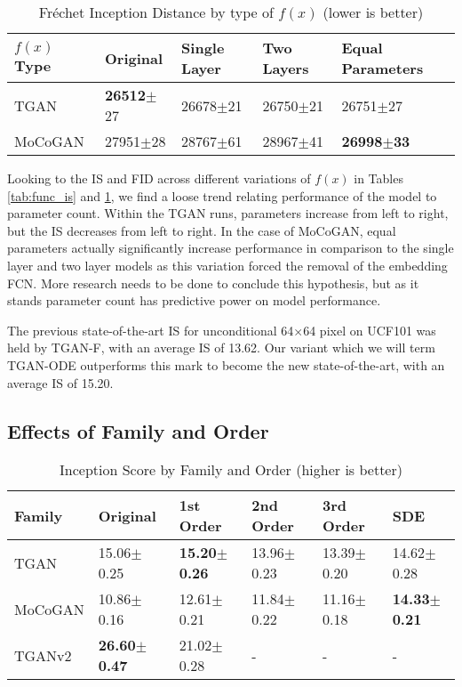 \documentclass[tablecaption=bottom,pmlr]{jmlr}
\begin{document}
\begin{table}[hbtp]
\centering
\begin{tabular}{lllll}
$f(x)$ Type & Original & Single Layer & Two Layers & Equal Parameters \\ \toprule
TGAN        &\textbf{26512}$\pm$27&26678$\pm$21&26750$\pm$21&26751$\pm$27 \\ \midrule
MoCoGAN     &27951$\pm$28&28767$\pm$61&28967$\pm$41&\textbf{26998$\pm$33}\\ \bottomrule
\end{tabular}
\caption{Fr\'echet Inception Distance by type of $f(x)$ (lower is better)}
\label{tab:func_fid}
\end{table}

Looking to the IS and FID across different variations of $f(x)$ in Tables \ref{tab:func_is} and \ref{tab:func_fid}, we find a loose trend relating performance of the model to parameter count. Within the TGAN runs, parameters increase from left to right, but the IS decreases from left to right. In the case of MoCoGAN, equal parameters actually significantly increase performance in comparison to the single layer and two layer models as this variation forced the removal of the embedding FCN. More research needs to be done to conclude this hypothesis, but as it stands parameter count has predictive power on model performance.

The previous state-of-the-art IS for unconditional 64$\times$64 pixel on UCF101 was held by TGAN-F, with an average IS of 13.62. Our variant which we will term TGAN-ODE outperforms this mark to become the new state-of-the-art, with an average IS of 15.20.


\subsection{Effects of Family and Order}

\begin{table}[hbtp]
\centering
\begin{tabular}{llllll}
Family  & Original & 1st Order & 2nd Order & 3rd Order & SDE \\ \toprule
TGAN    &15.06$\pm$0.25&\textbf{15.20$\pm$0.26}&13.96$\pm$0.23&13.39$\pm$0.20&14.62$\pm$0.28\\ \midrule
MoCoGAN &10.86$\pm$0.16&12.61$\pm$0.21&11.84$\pm$0.22&11.16$\pm$0.18&\textbf{14.33$\pm$0.21}\\ \midrule
TGANv2  &\textbf{26.60$\pm$0.47}\footnotemark[2]  &21.02$\pm$0.28&     -          &        -      & -   \\ \bottomrule
\end{tabular}
\caption{Inception Score by Family and Order (higher is better)}
\label{tab:fam_is}
\end{table}
\end{document}
